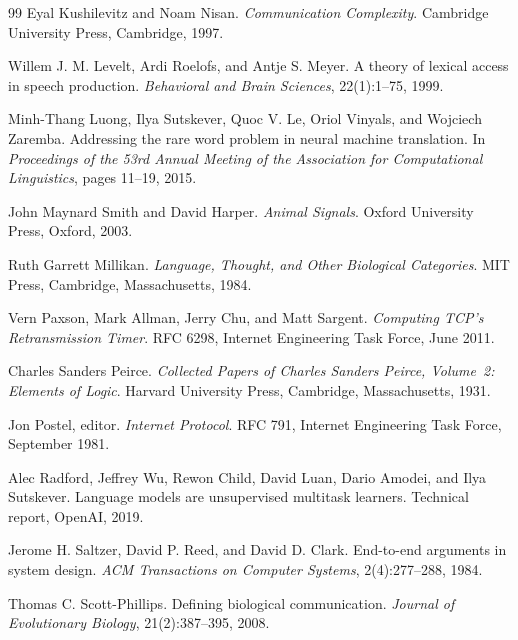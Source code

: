 \documentclass[11pt,a4paper]{article}
\theoremstyle{remark}\newtheorem{remark}[definition]{Remark}
\begin{document}
\begin{thebibliography}{99}
Eyal Kushilevitz and Noam Nisan.
\newblock \emph{Communication Complexity}.
\newblock Cambridge University Press, Cambridge, 1997.

Willem J. M. Levelt, Ardi Roelofs, and Antje S. Meyer.
\newblock A theory of lexical access in speech production.
\newblock \emph{Behavioral and Brain Sciences}, 22(1):1--75, 1999.

Minh-Thang Luong, Ilya Sutskever, Quoc V. Le, Oriol Vinyals, and Wojciech Zaremba.
\newblock Addressing the rare word problem in neural machine translation.
\newblock In \emph{Proceedings of the 53rd Annual Meeting of the Association for Computational Linguistics}, pages 11--19, 2015.

John Maynard Smith and David Harper.
\newblock \emph{Animal Signals}.
\newblock Oxford University Press, Oxford, 2003.

Ruth Garrett Millikan.
\newblock \emph{Language, Thought, and Other Biological Categories}.
\newblock MIT Press, Cambridge, Massachusetts, 1984.

Vern Paxson, Mark Allman, Jerry Chu, and Matt Sargent.
\newblock \emph{Computing TCP's Retransmission Timer}.
\newblock RFC 6298, Internet Engineering Task Force, June 2011.

Charles Sanders Peirce.
\newblock \emph{Collected Papers of Charles Sanders Peirce, Volume~2: Elements of Logic}.
\newblock Harvard University Press, Cambridge, Massachusetts, 1931.

Jon Postel, editor.
\newblock \emph{Internet Protocol}.
\newblock RFC 791, Internet Engineering Task Force, September 1981.

Alec Radford, Jeffrey Wu, Rewon Child, David Luan, Dario Amodei, and Ilya Sutskever.
\newblock Language models are unsupervised multitask learners.
\newblock Technical report, OpenAI, 2019.

Jerome H. Saltzer, David P. Reed, and David D. Clark.
\newblock End-to-end arguments in system design.
\newblock \emph{ACM Transactions on Computer Systems}, 2(4):277--288, 1984.

Thomas C. Scott-Phillips.
\newblock Defining biological communication.
\newblock \emph{Journal of Evolutionary Biology}, 21(2):387--395, 2008.


\end{thebibliography}
\end{document}
